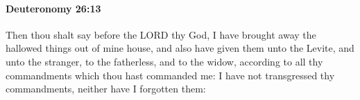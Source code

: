 
		\paragraph{Deuteronomy 26:13} %
			\label{DEUTERONOMY-26-13}

			Then thou shalt say before the LORD thy God, I have brought away the hallowed things out of mine house, and also have given them unto the Levite, and unto the stranger, to the fatherless, and to the widow, according to all thy commandments which thou hast commanded me: I have not transgressed thy commandments, neither have I forgotten them:


